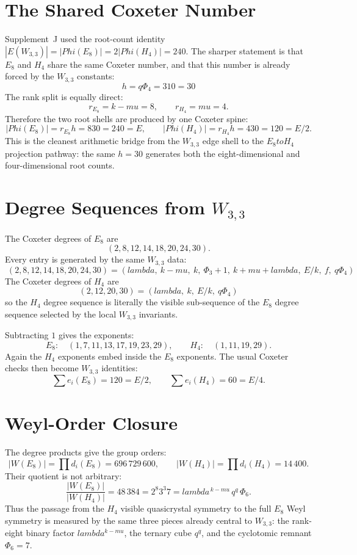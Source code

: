 \documentclass[12pt,a4paper]{article}
\def\lambda{lambda}%
\def\mu{mu}%
\def\Phi#1{Phi#1}%
\def\cdot{ }%
\def\to{ to }%
\theoremstyle{definition}
\begin{document}
\section*{The Shared Coxeter Number}

Supplement~J used the root-count identity
$|E(W_{3,3})|=|\Phi(E_8)|=2|\Phi(H_4)|=240$. The sharper statement is
that $E_8$ and $H_4$ share the same Coxeter number, and that this
number is already forced by the $W_{3,3}$ constants:
\[
\boxed{\;h = q\Phi_4 = 3\cdot 10 = 30\;}
\]
The rank split is equally direct:
\[
r_{E_8}=k-\mu=8,\qquad r_{H_4}=\mu=4.
\]
Therefore the two root shells are produced by one Coxeter spine:
\[
|\Phi(E_8)| = r_{E_8}h = 8\cdot 30 = 240 = E,
\qquad
|\Phi(H_4)| = r_{H_4}h = 4\cdot 30 = 120 = E/2.
\]
This is the cleanest arithmetic bridge from the $W_{3,3}$ edge shell to
the $E_8\to H_4$ projection pathway: the same $h=30$ generates both the
eight-dimensional and four-dimensional root counts.

\section*{Degree Sequences from $W_{3,3}$}

The Coxeter degrees of $E_8$ are
\[
(2,8,12,14,18,20,24,30).
\]
Every entry is generated by the same $W_{3,3}$ data:
\[
\boxed{\;(2,8,12,14,18,20,24,30)
=
(\lambda,\ k-\mu,\ k,\ \Phi_3+1,\ k+\mu+\lambda,\ E/k,\ f,\ q\Phi_4)\;}
\]
The Coxeter degrees of $H_4$ are
\[
\boxed{\;(2,12,20,30)=(\lambda,\ k,\ E/k,\ q\Phi_4)\;}
\]
so the $H_4$ degree sequence is literally the visible sub-sequence of
the $E_8$ degree sequence selected by the local $W_{3,3}$ invariants.

Subtracting $1$ gives the exponents:
\[
E_8:\quad (1,7,11,13,17,19,23,29),
\qquad
H_4:\quad (1,11,19,29).
\]
Again the $H_4$ exponents embed inside the $E_8$ exponents. The usual
Coxeter checks then become $W_{3,3}$ identities:
\[
\sum e_i(E_8)=120=E/2,\qquad
\sum e_i(H_4)=60=E/4.
\]

\section*{Weyl-Order Closure}

The degree products give the group orders:
\[
|W(E_8)|=\prod d_i(E_8)=696\,729\,600,\qquad
|W(H_4)|=\prod d_i(H_4)=14\,400.
\]
Their quotient is not arbitrary:
\[
\frac{|W(E_8)|}{|W(H_4)|}
=48\,384
=2^8\cdot 3^3\cdot 7
=\lambda^{\,k-\mu}\,q^q\,\Phi_6.
\]
Thus the passage from the $H_4$ visible quasicrystal symmetry to the
full $E_8$ Weyl symmetry is measured by the same three pieces already
central to $W_{3,3}$: the rank-eight binary factor $\lambda^{k-\mu}$,
the ternary cube $q^q$, and the cyclotomic remnant $\Phi_6=7$.
\end{document}
